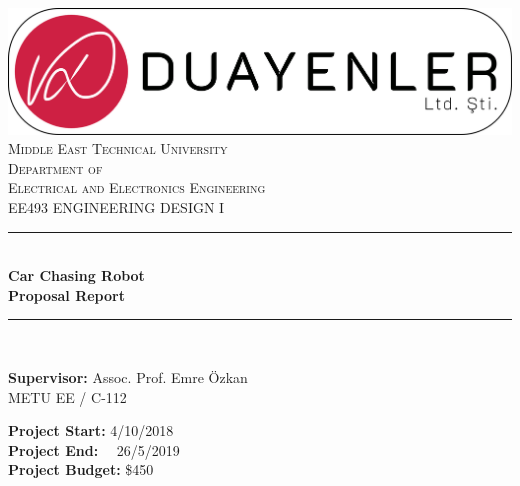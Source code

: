 \documentclass[a4paper,12pt]{article}
\begin{document}
\begin{titlepage}

\newcommand{\HRule}{\rule{\linewidth}{0.5mm}} %
\centering 

\includegraphics[width=\textwidth,height=\textheight,keepaspectratio]{../../Documents/logos/logo3-with-stroke}\\[0.5cm]

\textsc{\LARGE Middle East Technical University}\\[0.5cm] %
\textsc{\Large Department of \\Electrical and Electronics Engineering }\\[0.5cm] %
\textsc{\large EE493 ENGINEERING DESIGN I}\\[0.5cm] %


\HRule \\[0cm]
{ \huge \bfseries  Car Chasing Robot\\[0.1cm] \LARGE \bfseries Proposal Report}\\[0cm] %
\HRule \\[1cm]

\begin{minipage}[l]{0.6\textwidth}
\raggedright
		\large{\textbf{Supervisor:}}	Assoc. Prof. Emre Özkan \\
		\hspace{3.05cm}  METU EE / C-112

\end{minipage}
\begin{minipage}[r]{0.35\textwidth}
\raggedright
		\textbf{Project Start:} 4/10/2018\\
		\textbf{Project End:} \ \  26/5/2019\\
		\textbf{Project Budget:} \$450


\end{minipage}
\end{titlepage}
\end{document}
